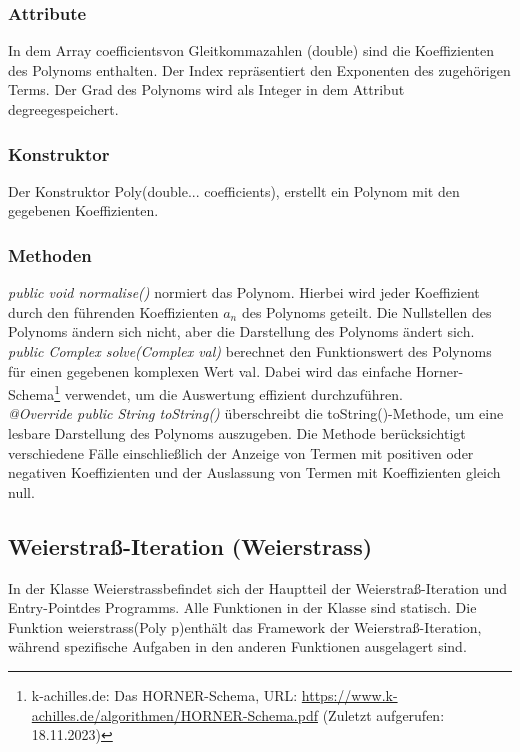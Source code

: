 \documentclass[12pt]{article}
\begin{document}
\subsubsection*{Attribute}
In dem Array \glqq coefficients\grqq\space von Gleitkommazahlen (double) sind die Koeffizienten des Polynoms enthalten. Der Index repräsentiert den Exponenten des zugehörigen Terms.
Der Grad des Polynoms wird als Integer in dem Attribut \glqq degree\grqq\space gespeichert. 

\subsubsection*{Konstruktor}
Der Konstruktor \glqq Poly(double... coefficients)\grqq, erstellt ein Polynom mit den gegebenen Koeffizienten.

\subsubsection*{Methoden}
\textit{public void normalise()} normiert das Polynom. Hierbei wird jeder Koeffizient durch den führenden Koeffizienten $a_n$ des Polynoms geteilt. Die Nullstellen des Polynoms ändern sich nicht, aber die Darstellung des Polynoms ändert sich.\\
\textit{public Complex solve(Complex val)} berechnet den Funktionswert des Polynoms für einen gegebenen komplexen Wert \glqq val\grqq. Dabei wird das einfache Horner-Schema\footnote{
    k-achilles.de: Das HORNER-Schema, URL: \url{https://www.k-achilles.de/algorithmen/HORNER-Schema.pdf} (Zuletzt aufgerufen: 18.11.2023)
} verwendet, um die Auswertung effizient durchzuführen. \\
\textit{@Override public String toString()} überschreibt die \glqq toString()\grqq -Methode, um eine lesbare Darstellung des Polynoms auszugeben. Die Methode berücksichtigt verschiedene Fälle einschließlich der Anzeige von Termen mit positiven oder negativen Koeffizienten und der Auslassung von Termen mit Koeffizienten gleich null.

\subsection{Weierstraß-Iteration (Weierstrass)}
In der Klasse \glqq Weierstrass\grqq\space befindet sich der Hauptteil der Weierstraß-Iteration und \glqq Entry-Point\grqq\space des Programms. Alle Funktionen in der Klasse sind statisch. Die Funktion \glqq weierstrass(Poly p)\grqq\space enthält das Framework der Weierstraß-Iteration, während spezifische Aufgaben in den anderen Funktionen ausgelagert sind.
\end{document}
